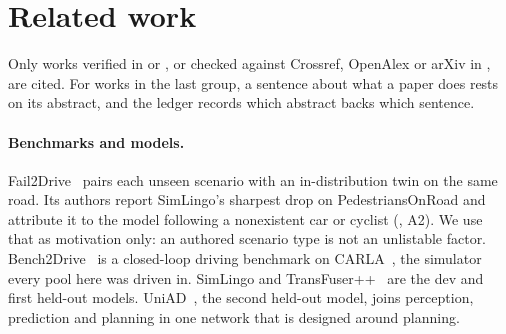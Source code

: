 \section{Related work}
\label{sec:related}

Only works verified in  or
, or checked against Crossref, OpenAlex or
arXiv in , are cited. For works in the
last group, a sentence about what a paper does rests on its abstract, and the
ledger records which abstract backs which sentence.

\paragraph{Benchmarks and models.}
Fail2Drive~\cite{gerstenecker2026fail2drive} pairs each unseen scenario with an
in-distribution twin on the same road. Its authors report SimLingo's sharpest
drop on PedestriansOnRoad and attribute it to the model following a
nonexistent car or cyclist (, A2). We use
that as motivation only: an authored scenario type is not an unlistable factor.
Bench2Drive~\cite{jia2024bench2drive} is a closed-loop driving benchmark on
CARLA~\cite{carla2017}, the simulator every pool here was driven in. SimLingo
\cite{Renz2025cvpr} and TransFuser++~\cite{jaeger2023hidden,zimmerlin2024hidden}
are the dev and first held-out models. UniAD~\cite{hu2023uniad}, the second
held-out model, joins perception, prediction and planning in one network that is
designed around planning.

